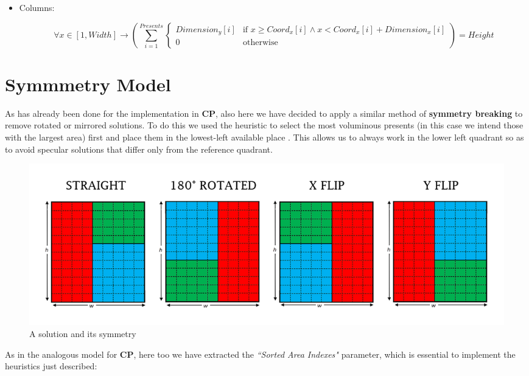 \begin{itemize}
\begin{itemize}
\begin{adjustwidth}{-3.3cm}{}
\begin{equation*}
{\begin{cases}
				\end{cases}
			}) = Width
		\end{equation*}\end{adjustwidth}
		\item[] Columns:
		\begin{adjustwidth}{-3.3cm}{}\begin{equation*} 
			\forall x \in [1, Width] \rightarrow (\sum_{i = 1}^{Presents}{
				\begin{cases}
					Dimension_y[i] & \text{if } x \geq Coord_x[i] \wedge x < Coord_x[i] + Dimension_x[i] \\
					0 & \text{otherwise}
				\end{cases}
			}) = Height
		\end{equation*}\end{adjustwidth}
	\end{itemize}
\end{itemize}



\newpage
\section{Symmmetry Model}
As has already been done for the implementation in \textbf{CP}, also here we have decided to apply a similar method of \textbf{symmetry breaking} to remove rotated or mirrored solutions. To do this we used the heuristic to select the most voluminous presents (in this case we intend those with the largest area) first and place them in the lowest-left available place \cite{binpack, algdesign}. This allows us to always work in the lower left quadrant so as to avoid specular solutions that differ only from the reference quadrant.

\begin{figure}[ht]
	\centering
	\includegraphics[width=\textwidth]{images/simple_simmetry.png}
	\caption{A solution and its symmetry}
	\label{fig:overlaps}
\end{figure}

As in the analogous model for \textbf{CP}, here too we have extracted the \textit{``Sorted Area Indexes"} parameter, which is essential to implement the heuristics just described:

